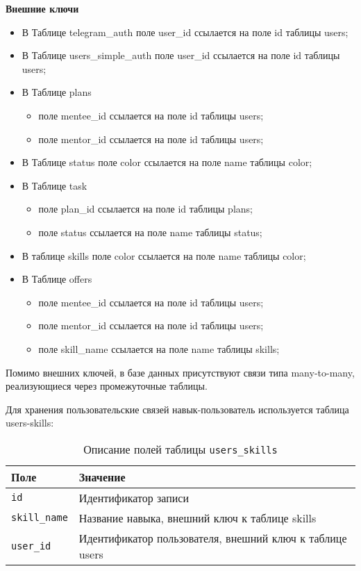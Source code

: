 \noindent\textbf{Внешние ключи}\\
\begin{itemize}
\item В Таблице telegram\_auth поле user\_id ссылается на поле id таблицы users;
\item В Таблице users\_simple\_auth поле user\_id ссылается на поле id таблицы users;
\item В Таблице plans 
	\begin{itemize}
		\item поле mentee\_id ссылается на поле id таблицы users;
		\item поле mentor\_id ссылается на поле id таблицы users;
	\end{itemize}
\item В Таблице status поле color ссылается на поле name таблицы color;
\item В Таблице task 
	\begin{itemize}
		\item поле plan\_id ссылается на поле id таблицы plans;
		\item поле status ссылается на поле name таблицы status;
	\end{itemize}
\item В таблице skills поле color ссылается на поле name таблицы color;
\item В Таблице offers 
	\begin{itemize}
		\item поле mentee\_id ссылается на поле id таблицы users;
		\item поле mentor\_id ссылается на поле id таблицы users;
		\item поле skill\_name ссылается на поле name таблицы skills;
	\end{itemize}
\end{itemize}
Помимо внешних ключей, в базе данных присутствуют связи типа many-to-many, реализующиеся через промежуточные таблицы.  

Для хранения пользовательские связей навык-пользователь используется таблица users-skills:
\begin{table}[!ht]
    \caption{Описание полей таблицы \texttt{users\_skills}}
    \label{tbl:users-skills}
    \begin{center}
        \begin{tabular}{|p{}p{}|}
            \hline
            \textbf{Поле} & \textbf{Значение} \\\hline
            \texttt{id} & Идентификатор записи \\\hline
            \texttt{skill\_name} & Название навыка, внешний ключ к таблице skills \\\hline
            \texttt{user\_id} & Идентификатор пользователя, внешний ключ к таблице users \\\hline
        \end{tabular}
    \end{center}
\end{table}

